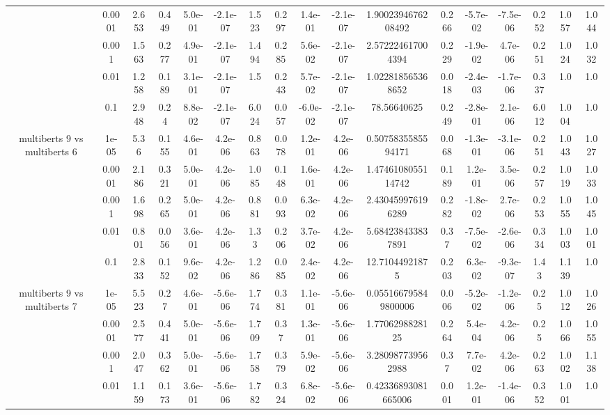 \begin{tabular}{|c|c|c|c|c|c|c|c|c|c|c|c|c|c|c|c|c|}
 & 0.0001 & 2.653 & 0.449 & 5.0e-01 & -2.1e-07 & 1.523 & 0.297 & 1.4e-01 & -2.1e-07 & 1.9002394676208492 & 0.266 & -5.7e-02 & -7.5e-06 & 0.252 & 1.057 & 1.044 \\
 & 0.001 & 1.563 & 0.277 & 4.9e-01 & -2.1e-07 & 1.494 & 0.285 & 5.6e-02 & -2.1e-07 & 2.572224617004394 & 0.229 & -1.9e-02 & 4.7e-06 & 0.251 & 1.024 & 1.032 \\
 & 0.01 & 1.258 & 0.189 & 3.1e-01 & -2.1e-07 & 1.5 & 0.243 & 5.7e-02 & -2.1e-07 & 1.022818565368652 & 0.018 & -2.4e-03 & -1.7e-06 & 0.337 & 1.0 & 1.0 \\
 & 0.1 & 2.948 & 0.24 & 8.8e-02 & -2.1e-07 & 6.024 & 0.057 & -6.0e-02 & -2.1e-07 & 78.56640625 & 0.249 & -2.8e-01 & 2.1e-06 & 6.012 & 1.004 & 1.0 \\
\hline
\multirow{5}{*}{multiberts 9 vs multiberts 6} & 1e-05 & 5.36 & 0.155 & 4.6e-01 & 4.2e-06 & 0.863 & 0.078 & 1.2e-01 & 4.2e-06 & 0.5075835585594171 & 0.068 & -1.3e-01 & -3.1e-06 & 0.251 & 1.043 & 1.027 \\
 & 0.0001 & 2.186 & 0.321 & 5.0e-01 & 4.2e-06 & 1.085 & 0.148 & 1.6e-01 & 4.2e-06 & 1.4746108055114742 & 0.189 & 1.2e-01 & 3.5e-06 & 0.257 & 1.019 & 1.033 \\
 & 0.001 & 1.698 & 0.265 & 5.0e-01 & 4.2e-06 & 0.881 & 0.093 & 6.3e-02 & 4.2e-06 & 2.430459976196289 & 0.282 & -1.8e-02 & 2.7e-06 & 0.253 & 1.055 & 1.045 \\
 & 0.01 & 0.801 & 0.056 & 3.6e-01 & 4.2e-06 & 1.33 & 0.206 & 3.7e-02 & 4.2e-06 & 5.684238433837891 & 0.37 & -7.5e-02 & -2.6e-06 & 0.334 & 1.003 & 1.001 \\
 & 0.1 & 2.833 & 0.152 & 9.6e-02 & 4.2e-06 & 1.286 & 0.085 & 2.4e-02 & 4.2e-06 & 12.71044921875 & 0.203 & 6.3e-02 & -9.3e-07 & 1.43 & 1.139 & 1.0 \\
\hline
\multirow{5}{*}{multiberts 9 vs multiberts 7} & 1e-05 & 5.523 & 0.27 & 4.6e-01 & -5.6e-06 & 1.774 & 0.381 & 1.1e-01 & -5.6e-06 & 0.055166795849800006 & 0.006 & -5.2e-02 & -1.2e-06 & 0.25 & 1.012 & 1.026 \\
 & 0.0001 & 2.577 & 0.441 & 5.0e-01 & -5.6e-06 & 1.709 & 0.37 & 1.3e-01 & -5.6e-06 & 1.7706298828125 & 0.264 & 5.4e-04 & 4.2e-06 & 0.25 & 1.066 & 1.055 \\
 & 0.001 & 2.047 & 0.362 & 5.0e-01 & -5.6e-06 & 1.758 & 0.379 & 5.9e-02 & -5.6e-06 & 3.280987739562988 & 0.37 & 7.7e-02 & 4.2e-06 & 0.263 & 1.002 & 1.138 \\
 & 0.01 & 1.159 & 0.173 & 3.6e-01 & -5.6e-06 & 1.782 & 0.324 & 6.8e-02 & -5.6e-06 & 0.42336893081665006 & 0.001 & 1.2e-01 & -1.4e-06 & 0.352 & 1.001 & 1.0 \\

\end{tabular}
